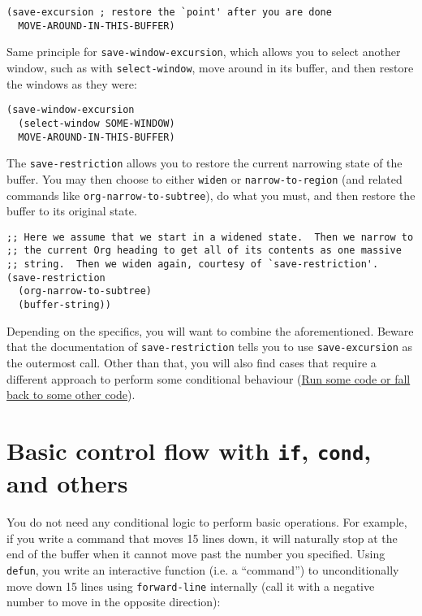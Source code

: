 \documentclass[11pt]{ctexart}
\begin{document}
\begin{verbatim}
(save-excursion ; restore the `point' after you are done
  MOVE-AROUND-IN-THIS-BUFFER)
\end{verbatim}

Same principle for \texttt{save-window-excursion}, which allows you to select another window, such as with \texttt{select-window}, move around in its buffer, and then restore the windows as they were:

\begin{verbatim}
(save-window-excursion
  (select-window SOME-WINDOW)
  MOVE-AROUND-IN-THIS-BUFFER)
\end{verbatim}

The \texttt{save-restriction} allows you to restore the current narrowing state of the buffer. You may then choose to either \texttt{widen} or \texttt{narrow-to-region} (and related commands like \texttt{org-narrow-to-subtree}), do what you must, and then restore the buffer to its original state.

\begin{verbatim}
;; Here we assume that we start in a widened state.  Then we narrow to
;; the current Org heading to get all of its contents as one massive
;; string.  Then we widen again, courtesy of `save-restriction'.
(save-restriction
  (org-narrow-to-subtree)
  (buffer-string))
\end{verbatim}

Depending on the specifics, you will want to combine the aforementioned. Beware that the documentation of \texttt{save-restriction} tells you to use \texttt{save-excursion} as the outermost call. Other than that, you will also find cases that require a different approach to perform some conditional behaviour (\hyperref[sec:orgd0c57f0]{Run some code or fall back to some other code}).
\section{Basic control flow with \texttt{if}, \texttt{cond}, and others}
\label{sec:org9074f8f}
You do not need any conditional logic to perform basic operations. For example, if you write a command that moves 15 lines down, it will naturally stop at the end of the buffer when it cannot move past the number you specified. Using \texttt{defun}, you write an interactive function (i.e. a ``command'') to unconditionally move down 15 lines using \texttt{forward-line} internally (call it with a negative number to move in the opposite direction):
\end{document}
